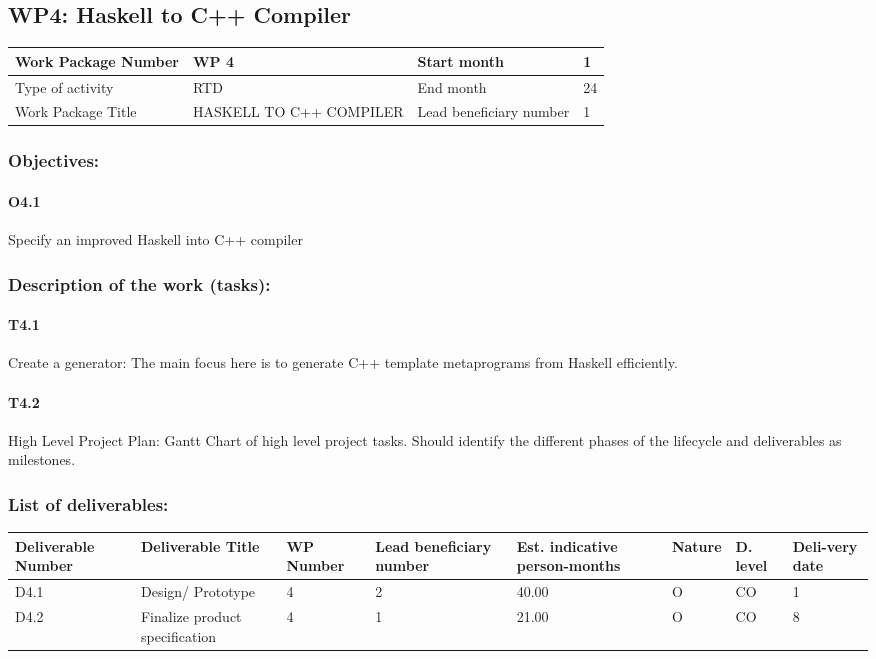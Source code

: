\documentclass{article}
\begin{document}
\newpage
\subsection{WP4: Haskell to C++ Compiler}
 
\begin{center}
 	\begin{tabular}{ |p{3cm}|p{4cm}||p{2cm}|p{1cm}| }
 		\hline
 		Work Package Number & WP 4 & Start month & 1  \\ \hline
 		Type of activity & RTD & End month & 24 \\ \hline
 		Work Package Title & HASKELL TO C++ COMPILER & Lead beneficiary number & 1 \\ \hline
 	\end{tabular}
\end{center}

\subsubsection{Objectives:}
\paragraph{O4.1} Specify an improved Haskell into C++ compiler

\subsubsection{Description of the work (tasks):}
\paragraph{T4.1} Create a generator: The main focus here is to generate C++ template metaprograms from Haskell efficiently.
\paragraph{T4.2} High Level Project Plan: Gantt Chart of high level project tasks. Should identify the different phases of the lifecycle and deliverables as milestones. 

\subsubsection{List of deliverables:}
\begin{center}
	\begin{tabular}{ |p{1.6cm}|p{2cm}|p{0.8cm}|p{0.8cm}|p{0.9cm}|p{1cm}|p{0.5cm}|p{0.8cm}| }
		\hline
		Deliverable Number & Deliverable Title & WP Number & Lead beneficiary number & Est. indicative person-months & Nature & D. level & Deli-very date \\ \hline
		D4.1 & Design/ Prototype  & 4 & 2 & 40.00 & O & CO & 1 \\ \hline
		D4.2 & Finalize product specification  & 4 & 1 & 21.00 & O & CO & 8 \\ \hline
	\end{tabular}
\end{center}
\end{document}

